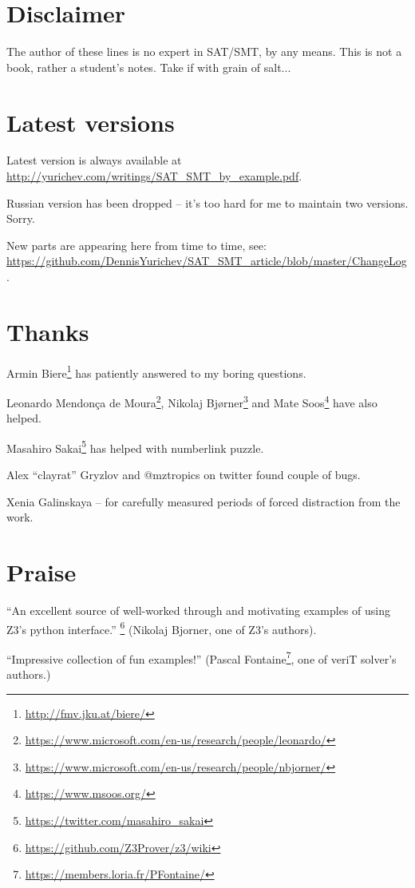 \section{Disclaimer}

The author of these lines is no expert in SAT/SMT, by any means.
This is not a book, rather a student's notes.
Take if with grain of salt...

\section{Latest versions}

Latest version is always available at \url{http://yurichev.com/writings/SAT_SMT_by_example.pdf}.

Russian version has been dropped -- it's too hard for me to maintain two versions. Sorry.

New parts are appearing here from time to time, see: \url{https://github.com/DennisYurichev/SAT_SMT_article/blob/master/ChangeLog}.

\section{Thanks}

Armin Biere\footnote{\url{http://fmv.jku.at/biere/}} has patiently answered to my boring questions.

Leonardo Mendonça de Moura\footnote{\url{https://www.microsoft.com/en-us/research/people/leonardo/}},
Nikolaj Bjørner\footnote{\url{https://www.microsoft.com/en-us/research/people/nbjorner/}}
and Mate Soos\footnote{\url{https://www.msoos.org/}} have also helped.

Masahiro Sakai\footnote{\url{https://twitter.com/masahiro_sakai}} has helped with numberlink puzzle.

Alex ``clayrat'' Gryzlov and @mztropics on twitter found couple of bugs.

Xenia Galinskaya -- for carefully measured periods of forced distraction from the work.

\section{Praise}

``An excellent source of well-worked through and motivating examples of using Z3's python interface.''
\footnote{\url{https://github.com/Z3Prover/z3/wiki}}
(Nikolaj Bjorner, one of Z3's authors).

``Impressive collection of fun examples!''
(Pascal Fontaine\footnote{\url{https://members.loria.fr/PFontaine/}}, one of veriT solver's authors.)

